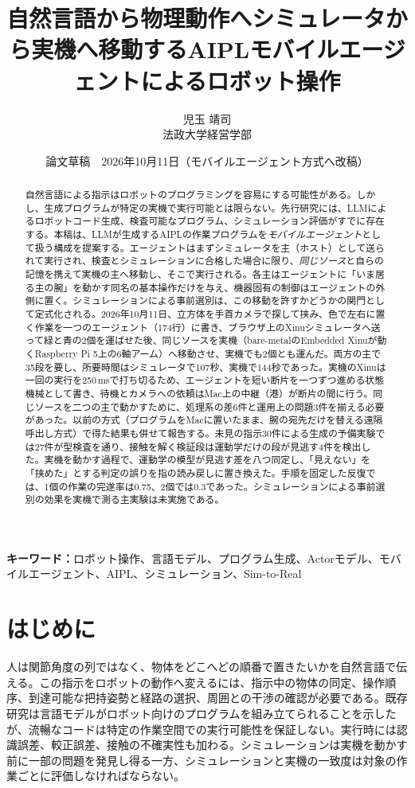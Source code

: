\documentclass[10pt,letterpaper]{article}
\title{自然言語から物理動作へ\quad シミュレータから実機へ移動するAIPLモバイルエージェントによるロボット操作}
\author{児玉 靖司\\法政大学経営学部}
\date{論文草稿　2026年10月11日（モバイルエージェント方式へ改稿）}
\begin{document}
\maketitle
\begin{abstract}
自然言語による指示はロボットのプログラミングを容易にする可能性がある。しかし、生成プログラムが特定の実機で実行可能とは限らない。先行研究には、LLMによるロボットコード生成、検査可能なプログラム、シミュレーション評価がすでに存在する。本稿は、LLMが生成するAIPLの作業プログラムを\emph{モバイルエージェント}として扱う構成を提案する。エージェントはまずシミュレータを主（ホスト）として送られて実行され、検査とシミュレーションに合格した場合に限り、\emph{同じソース}と自らの記憶を携えて実機の主へ移動し、そこで実行される。各主はエージェントに「いま居る主の腕」を動かす同名の基本操作だけを与え、機器固有の制御はエージェントの外側に置く。シミュレーションによる事前選別は、この移動を許すかどうかの関門として定式化される。2026年10月11日、立方体を手首カメラで探して挟み、色で左右に置く作業を一つのエージェント（174行）に書き、ブラウザ上のXinuシミュレータへ送って緑と青の2個を運ばせた後、同じソースを実機（bare-metalのEmbedded Xinuが動くRaspberry Pi 5上の6軸アーム）へ移動させ、実機でも2個とも運んだ。両方の主で35段を要し、所要時間はシミュレータで107秒、実機で144秒であった。実機のXinuは一回の実行を250\,msで打ち切るため、エージェントを短い断片を一つずつ進める状態機械として書き、待機とカメラへの依頼はMac上の中継（港）が断片の間に行う。同じソースを二つの主で動かすために、処理系の差6件と運用上の問題3件を揃える必要があった。以前の方式（プログラムをMacに置いたまま、腕の宛先だけを替える遠隔呼出し方式）で得た結果も併せて報告する。未見の指示30件による生成の予備実験では27件が型検査を通り、接触を解く検証段は運動学だけの段が見逃す4件を検出した。実機を動かす過程で、運動学の模型が見逃す差を八つ同定し、「見えない」を「挟めた」とする判定の誤りを指の読み戻しに置き換えた。手順を固定した反復では、1個の作業の完遂率は0.75、2個では0.3であった。シミュレーションによる事前選別の効果を実機で測る主実験は未実施である。
\end{abstract}

\noindent\textbf{キーワード：}ロボット操作、言語モデル、プログラム生成、Actorモデル、モバイルエージェント、AIPL、シミュレーション、Sim-to-Real

\section{はじめに}
人は関節角度の列ではなく、物体をどこへどの順番で置きたいかを自然言語で伝える。この指示をロボットの動作へ変えるには、指示中の物体の同定、操作順序、到達可能な把持姿勢と経路の選択、周囲との干渉の確認が必要である。既存研究は言語モデルがロボット向けのプログラムを組み立てられることを示したが、流暢なコードは特定の作業空間での実行可能性を保証しない\cite{liang2022,huang2023}。実行時には認識誤差、較正誤差、接触の不確実性も加わる。シミュレーションは実機を動かす前に一部の問題を発見し得る一方、シミュレーションと実機の一致度は対象の作業ごとに評価しなければならない\cite{li2025}。
\end{document}
